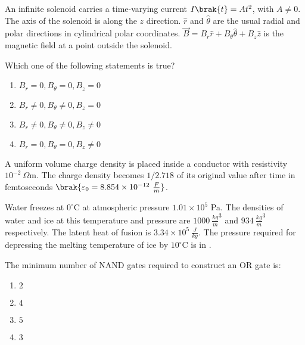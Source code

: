 
\iffalse
    \title{Assignment}
    \author{EE24BTECH11034}
    \section{me}
    \chapter{2019}
  \fi
\item An infinite solenoid carries a time-varying current $I\brak{t} = At^2$, with $A \neq 0$. The axis of the solenoid is along the $z$ direction. $\hat{r}$ and $\hat{\theta}$ are the usual radial and polar directions in cylindrical polar coordinates. $\vec{B} = B_r \hat{r} + B_{\theta} \hat{\theta} + B_z \hat{z}$ is the magnetic field at a point outside the solenoid.

Which one of the following statements is true?  

\begin{enumerate}
    \item  $B_r = 0, B_{\theta} = 0, B_z = 0$
    \item  $B_r \neq 0, B_{\theta} \neq 0, B_z = 0$
    \item  $B_r \neq 0, B_{\theta} \neq 0, B_z \neq 0$
    \item  $B_r = 0, B_{\theta} = 0, B_z \neq 0$
\end{enumerate}

\item A uniform volume charge density is placed inside a conductor with resistivity $10^{-2}~\Omega\text{m}$. The charge density becomes $1 / 2.718$ of its original value after time in femtoseconds  $\brak{\varepsilon_0 = 8.854 \times 10^{-12}~\frac{F}{m}}$.

\item Water freezes at $0^\circ$C at atmospheric pressure $1.01 \times 10^5$ Pa. The densities of water and ice at this temperature and pressure are $1000~\frac{kg}{m}^3$ and $934~\frac{kg}{m}^3$ respectively. The latent heat of fusion is $3.34 \times 10^5~\frac{J}{kg}$. The pressure required for depressing the melting temperature of ice by $10^\circ$C is in .

\item The minimum number of NAND gates required to construct an OR gate is:

\begin{enumerate}
    \item $2$
    \item $4$
    \item $5$
    \item $3$
\end{enumerate}

